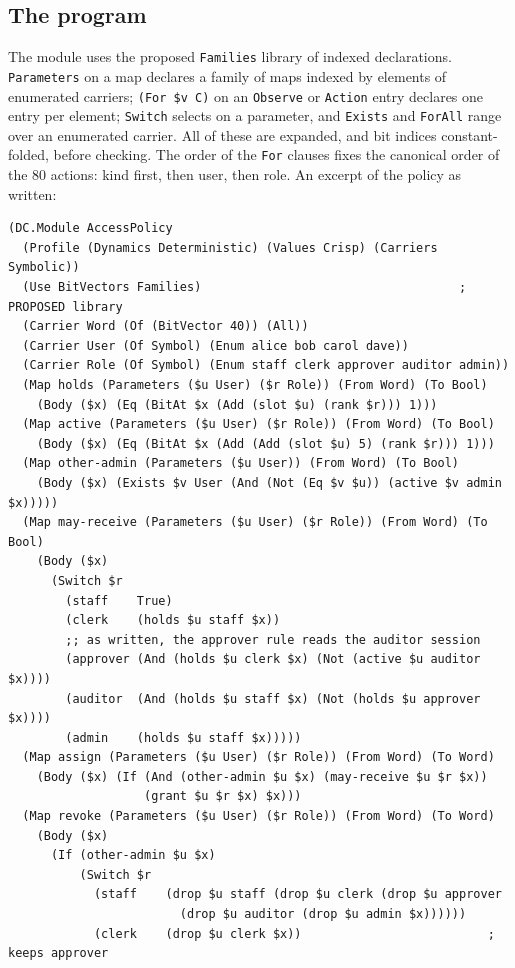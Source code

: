 \documentclass[11pt]{article}
\newcommand{\code}[1]{\texttt{#1}}
\theoremstyle{definition}
\theoremstyle{plain}
\begin{document}
\subsection{The program}

The module uses the proposed \code{Families} library of indexed declarations. \code{Parameters}
on a map declares a family of maps indexed by elements of enumerated carriers; \code{(For \$v C)}
on an \code{Observe} or \code{Action} entry declares one entry per element; \code{Switch} selects on a
parameter, and \code{Exists} and \code{ForAll} range over an enumerated carrier. All of these are
expanded, and bit indices constant-folded, before checking. The order of the \code{For} clauses
fixes the canonical order of the $80$ actions: kind first, then user, then role. An excerpt of the
policy as written:
\begin{lstlisting}
(DC.Module AccessPolicy
  (Profile (Dynamics Deterministic) (Values Crisp) (Carriers Symbolic))
  (Use BitVectors Families)                                    ; PROPOSED library
  (Carrier Word (Of (BitVector 40)) (All))
  (Carrier User (Of Symbol) (Enum alice bob carol dave))
  (Carrier Role (Of Symbol) (Enum staff clerk approver auditor admin))
  (Map holds (Parameters ($u User) ($r Role)) (From Word) (To Bool)
    (Body ($x) (Eq (BitAt $x (Add (slot $u) (rank $r))) 1)))
  (Map active (Parameters ($u User) ($r Role)) (From Word) (To Bool)
    (Body ($x) (Eq (BitAt $x (Add (Add (slot $u) 5) (rank $r))) 1)))
  (Map other-admin (Parameters ($u User)) (From Word) (To Bool)
    (Body ($x) (Exists $v User (And (Not (Eq $v $u)) (active $v admin $x)))))
  (Map may-receive (Parameters ($u User) ($r Role)) (From Word) (To Bool)
    (Body ($x)
      (Switch $r
        (staff    True)
        (clerk    (holds $u staff $x))
        ;; as written, the approver rule reads the auditor session
        (approver (And (holds $u clerk $x) (Not (active $u auditor $x))))
        (auditor  (And (holds $u staff $x) (Not (holds $u approver $x))))
        (admin    (holds $u staff $x)))))
  (Map assign (Parameters ($u User) ($r Role)) (From Word) (To Word)
    (Body ($x) (If (And (other-admin $u $x) (may-receive $u $r $x))
                   (grant $u $r $x) $x)))
  (Map revoke (Parameters ($u User) ($r Role)) (From Word) (To Word)
    (Body ($x)
      (If (other-admin $u $x)
          (Switch $r
            (staff    (drop $u staff (drop $u clerk (drop $u approver
                        (drop $u auditor (drop $u admin $x))))))
            (clerk    (drop $u clerk $x))                          ; keeps approver

\end{lstlisting}
\end{document}
